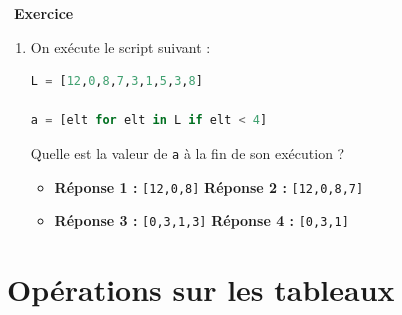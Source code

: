 \documentclass[
  11pt,
]{article}
\newcommand{\passthrough}[1]{#1}
\providecommand{\tightlist}{%
  \setlength{\itemsep}{0pt}\setlength{\parskip}{0pt}}
\newcounter{exo}
\newenvironment{exercice}[1]
{\par \medskip   \addtocounter{exo}{1} \noindent  
\begin{bclogo}[arrondi =0.1,   noborder = true, logo=\bccrayon, marge=4]{~\textbf{Exercice} \textbf{\theexo} {\itshape #1} }  \par}
{
\end{bclogo}
 \par \bigskip }
\newcounter{def}
\begin{document}
\begin{exercice}{}
\begin{enumerate}
\def\labelenumi{\arabic{enumi}.}
\setcounter{enumi}{3}
\item
  On exécute le script suivant :

\begin{lstlisting}[language=Python]
L = [12,0,8,7,3,1,5,3,8]

a = [elt for elt in L if elt < 4]
\end{lstlisting}

  Quelle est la valeur de \passthrough{\lstinline!a!} à la fin de son
  exécution ?

  \begin{itemize}
  \tightlist
  \item
    \textbf{Réponse 1 :} \passthrough{\lstinline![12,0,8]!}
    \textbf{Réponse 2 :} \passthrough{\lstinline![12,0,8,7]!}
  \item
    \textbf{Réponse 3 :} \passthrough{\lstinline![0,3,1,3]!}
    \textbf{Réponse 4 :} \passthrough{\lstinline![0,3,1]!}
  \end{itemize}
\end{enumerate}

\end{exercice}

\hypertarget{opuxe9rations-sur-les-tableaux}{%
\section{Opérations sur les
tableaux}\label{opuxe9rations-sur-les-tableaux}}
\end{document}
